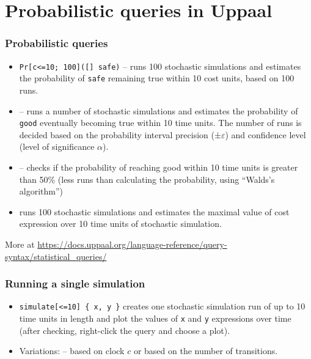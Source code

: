 \documentclass[aspectratio=169]{beamer}
\begin{document}
\section{Probabilistic queries in Uppaal}

\begin{frame}[t]\frametitle{Probabilistic queries}
    
  \begin{itemize}
    \item \alert{\texttt{Pr[c<=10; 100]([] safe)}} -- 
    runs 100 stochastic simulations and estimates the probability of \texttt{safe} remaining true within 10 cost units, based on 100 runs.

    \item {} --
    runs a number of stochastic simulations and estimates the probability of \texttt{good} eventually becoming true within 10 time units. The number of runs is decided based on the probability interval precision (±$\varepsilon$) and confidence level (level of significance $\alpha$).

    \item {} --
    checks if the probability of reaching good within 10 time units is greater than 50\%
    (less runs than calculating the probability, using ``Walds's algorithm'')
    \item {}
    runs 100 stochastic simulations and estimates the maximal value of cost expression over 10 time units of stochastic simulation.
  \end{itemize}


  {\footnotesize More at \url{https://docs.uppaal.org/language-reference/query-syntax/statistical_queries/}}

\end{frame}

\begin{frame}[t]\frametitle{Running a single simulation}
    
  \begin{itemize}
    \item \alert{\texttt{simulate[<=10] \{ x, y \}}}
    creates one stochastic simulation run of up to 10 time units in length and plot the values of \texttt{x} and \texttt{y} expressions over time (after checking, right-click the query and choose a plot).
    \item Variations: \structure{\texttt{[c<=10] / [\#<=10]}} -- based on clock $c$ or based on the number of transitions.
  \end{itemize}


\end{frame}
\end{document}
